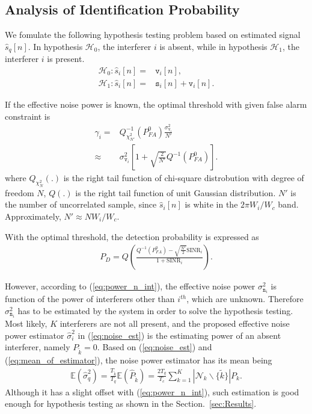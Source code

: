 \documentclass{IEEEtran}
\begin{document}
\subsection{Analysis of Identification Probability}
We fomulate the following hypothesis testing problem based on estimated signal $\hat{s}_q[n]$. In hypothesis $\mathcal{H}_0$, the interferer $i$ is absent, while in hypothesis $\mathcal{H}_1$, the interferer $i$ is present.
\begin{align}
\mathcal{H}_0: \hat{s}_i[n] = &\mathtt{v}_i[n],\nonumber\\
\mathcal{H}_1: \hat{s}_i[n] = &\mathtt{s}_i[n]+\mathtt{v}_i[n].
\end{align}

If the effective noise power is known, the optimal threshold with given false alarm constraint is
\begin{align}
\gamma_i =& Q^{-1}_{\chi^2_{N'}}\left(P_{FA}^0\right)\frac{\sigma^2_{\mathtt{v}_i}}{N'}\nonumber\\
\approx &\sigma^2_{\mathtt{v}_i}\left[1+\sqrt{\frac{2}{N'}}Q^{-1}\left(P_{FA}^0\right)\right].
\label{eq:threshold_calculation}
\end{align}
where $Q_{\chi^2_N}(.)$ is the right tail function of chi-square distrobution with degree of freedom $N$, $Q(.)$ is the right tail function of unit Gaussian distribution. $N'$ is the number of uncorrelated sample, since $\hat{s}_i[n]$ is white in the $2\pi W_i/W_c$ band. Approximately, $N' \approx NW_i/W_c$.

With the optimal threshold, the detection probability is expressed as
\begin{align}
P_D = Q\left(\frac{Q^{-1}\left(P_{FA}^0\right)-\sqrt{\frac{N'}{2}}\text{SINR}_i}{1+\text{SINR}_i}\right).
\end{align}

However, according to (\ref{eq:power_n_int}), the effective noise power $\sigma^2_{\mathtt{n}_i}$ is function of the power of interferers other than $i^{th}$, which are unknown. Therefore $\sigma^2_{\mathtt{n}_i}$ has to be estimated by the system in order to solve the hypothesis testing. Most likely, $K$ interferers are not all present, and the proposed effective noise power estimator $\hat{\sigma}_i^2$ in (\ref{eq:noise_est}) is the estimating power of an absent interferer, namely $P_{\tilde{k}} = 0$. Based on (\ref{eq:noise_est}) and (\ref{eq:mean_of_estimator}), the noise power estimator has its mean being
\begin{align}
\mathbb{E}(\hat{\sigma}_q^2) = \frac{T_{\tilde{k}}}{T_q}\mathbb{E}(\hat{P}_{\tilde{k}}) = \frac{2T_q}{T_c}\sum_{k=1}^{K}|\mathcal{N}_k\backslash\{\tilde{k}\}|P_k.
\end{align}
Although it has a slight offset with (\ref{eq:power_n_int}), such estimation is good enough for hypothesis testing as shown in the Section.~\ref{sec:Results}.
\end{document}
